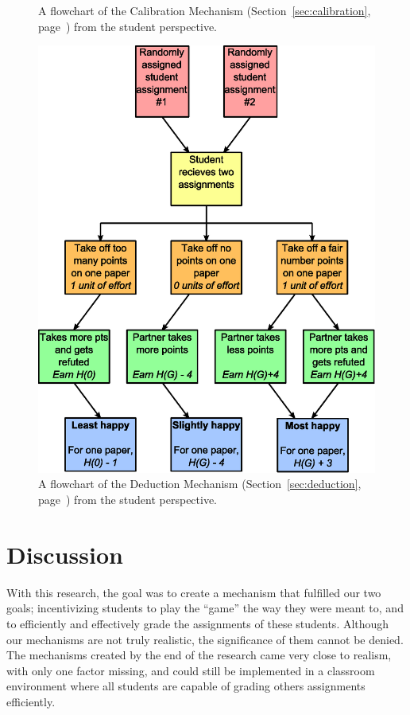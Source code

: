 \documentclass[12pt, Arial]{article}
\begin{document}
{\begin{figure}
		\caption {A flowchart of the Calibration Mechanism (Section~\ref{sec:calibration}, page~\pageref{sec:calibration}) from the student perspective.\label{fig:calibration}}
\end{figure}
\begin{figure}
	\centering
		\includegraphics[width=\textwidth]{Flowchart-Deduction.eps}
		\caption {A flowchart of the Deduction Mechanism (Section~\ref{sec:deduction}, page~\pageref{sec:deduction}) from the student perspective.\label{fig:deduction}}
\end{figure}
}
\section{Discussion}
With this research, the goal was to create a mechanism that fulfilled our two goals; incentivizing students to play the ``game'' the way they were meant to, and to efficiently and effectively grade the assignments of these students. Although our mechanisms are not truly realistic, the significance of them cannot be denied. The mechanisms created by the end of the research came very close to realism, with only one factor missing, and could still be implemented in a classroom environment where all students are capable of grading others assignments efficiently.
\end{document}
